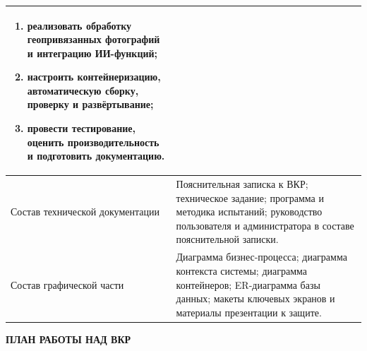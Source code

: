 \begin{tabular}{|p{\assignmentlabelwidth}|p{\assignmentvaluewidth}|}
\begin{minipage}[t]{\assignmentvaluewidth}
\begin{enumerate}
\item реализовать обработку геопривязанных фотографий и интеграцию ИИ-функций;
\item настроить контейнеризацию, автоматическую сборку, проверку и развёртывание;
\item провести тестирование, оценить производительность и подготовить документацию.
\end{enumerate}
\vspace{2pt}
\end{minipage} \\
\hline
Состав технической документации & Пояснительная записка к ВКР; техническое задание; программа и методика испытаний; руководство пользователя и администратора в составе пояснительной записки. \\
\hline
Состав графической части & Диаграмма бизнес-процесса; диаграмма контекста системы; диаграмма контейнеров; ER-диаграмма базы данных; макеты ключевых экранов и материалы презентации к защите. \\
\hline
\end{tabular}

\vspace{6pt}

\begin{center}
\textbf{ПЛАН РАБОТЫ НАД ВКР}
\end{center}

\vspace{2pt}

